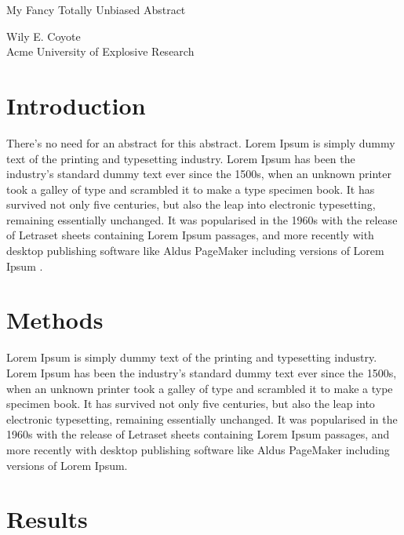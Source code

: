 \documentclass[a4paper,10pt]{article}
\theoremstyle{definition}
\begin{document}
\fancyhf{}
\renewcommand{\headrulewidth}{0pt}
\renewcommand{\footrulewidth}{0.4pt}

\Large
 \begin{center}
My Fancy Totally Unbiased Abstract
\hspace{10pt}

\large
Wily E. Coyote \\
  
\small Acme University of Explosive Research

\end{center}

\hspace{10pt}

\normalsize

\section{Introduction}

There's no need for an abstract for this abstract. Lorem Ipsum is simply dummy text of the printing and typesetting industry. Lorem Ipsum has been the industry's standard dummy text ever since the 1500s, when an unknown printer took a galley of type and scrambled it to make a type specimen book. It has survived not only five centuries, but also the leap into electronic typesetting, remaining essentially unchanged. It was popularised in the 1960s with the release of Letraset sheets containing Lorem Ipsum passages, and more recently with desktop publishing software like Aldus PageMaker including versions of Lorem Ipsum \cite{knuth:1984}.

\section{Methods}

Lorem Ipsum is simply dummy text of the printing and typesetting industry. Lorem Ipsum has been the industry's standard dummy text ever since the 1500s, when an unknown printer took a galley of type and scrambled it to make a type specimen book. It has survived not only five centuries, but also the leap into electronic typesetting, remaining essentially unchanged. It was popularised in the 1960s with the release of Letraset sheets containing Lorem Ipsum passages, and more recently with desktop publishing software like Aldus PageMaker including versions of Lorem Ipsum.

\section{Results}
\end{document}
